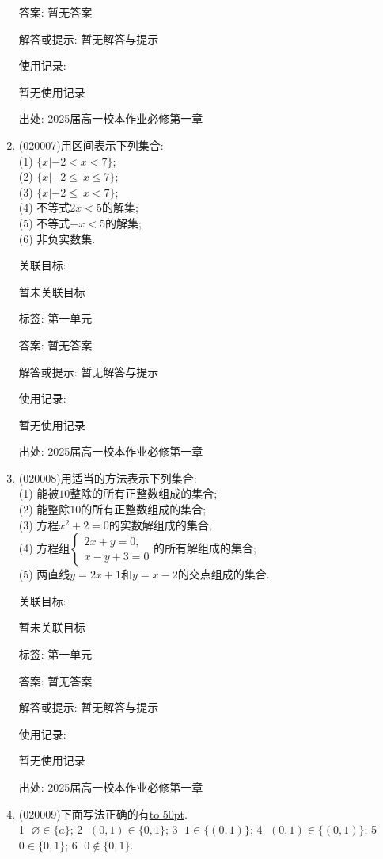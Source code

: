 \documentclass[10pt,a4paper]{article}
\newcommand{\blank}[1]{\underline{\hbox to #1pt{}}}
\begin{document}
\begin{enumerate}[1.]
答案: 暂无答案

解答或提示: 暂无解答与提示

使用记录:

暂无使用记录


出处: 2025届高一校本作业必修第一章
\item { (020007)}用区间表示下列集合:\\
(1) $\{x|-2<x<7\}$;\\
(2) $\{x|-2\le\ x\le7\}$;\\
(3) $\{x|-2\le\ x<7\}$;\\
(4) 不等式$2x<5$的解集;\\
(5) 不等式$-x<5$的解集; \\
(6) 非负实数集.


关联目标:

暂未关联目标



标签: 第一单元

答案: 暂无答案

解答或提示: 暂无解答与提示

使用记录:

暂无使用记录


出处: 2025届高一校本作业必修第一章
\item { (020008)}用适当的方法表示下列集合:\\
(1) 能被$10$整除的所有正整数组成的集合;\\
(2) 能整除$10$的所有正整数组成的集合;\\
(3) 方程$x^2+2=0$的实数解组成的集合;\\
(4) 方程组$\begin{cases}2x+y=0, \\ x-y+3=0\end{cases}$的所有解组成的集合;\\
(5) 两直线$y=2x+1$和$y=x-2$的交点组成的集合.


关联目标:

暂未关联目标



标签: 第一单元

答案: 暂无答案

解答或提示: 暂无解答与提示

使用记录:

暂无使用记录


出处: 2025届高一校本作业必修第一章
\item { (020009)}下面写法正确的有\blank{50}.\\
\textcircled{1} $\varnothing\in\{a\}$; \textcircled{2} $(0, 1)\in\{0, 1\}$; \textcircled{3} $1 \in \{(0,1)\}$; \textcircled{4} $(0,1) \in \{(0,1)\}$; \textcircled{5} $0\in \{0,1\}$; \textcircled{6} $0 \notin \{0,1\}$.



\end{enumerate}
\end{document}
